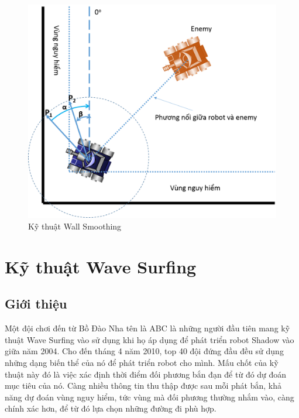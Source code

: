 \documentclass[14pt]{article}
\begin{document}
\begin{figure}[H]
\centering
\includegraphics[scale=0.5]{images/wallsmoothing.png}
\caption{Kỹ thuật Wall Smoothing}
\end{figure}
\section{Kỹ thuật Wave Surfing}
\subsection{Giới thiệu}
Một đội chơi đến từ Bồ Đào Nha tên là ABC là những người đầu tiên mang kỹ thuật Wave Surfing vào sử dụng khi họ áp dụng để phát triển robot Shadow vào giữa năm 2004. Cho đến tháng 4 năm 2010, top 40 đội đứng đầu đều sử dụng những dạng biến thể của nó để phát triển robot cho mình. Mấu chốt của kỹ thuật này đó là việc xác định thời điểm đối phương bắn đạn để từ đó dự đoán mục tiêu của nó. Càng nhiều thông tin thu thập được sau mỗi phát bắn, khả năng dự đoán vùng nguy hiểm, tức vùng mà đối phương thường nhắm vào, càng chính xác hơn, để từ đó lựa chọn những đường đi phù hợp.
\end{document}
